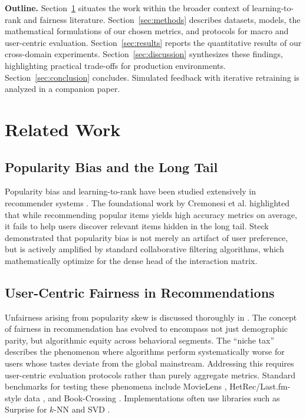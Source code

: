 \documentclass[conference]{IEEEtran}
\begin{document}
\textbf{Outline.} Section~\ref{sec:related} situates the work within the broader context of learning-to-rank and fairness literature. Section~\ref{sec:methods} describes datasets, models, the mathematical formulations of our chosen metrics, and protocols for macro and user-centric evaluation. Section~\ref{sec:results} reports the quantitative results of our cross-domain experiments. Section~\ref{sec:discussion} synthesizes these findings, highlighting practical trade-offs for production environments. Section~\ref{sec:conclusion} concludes. Simulated feedback with iterative retraining is analyzed in a companion paper.

\section{Related Work}
\label{sec:related}

\subsection{Popularity Bias and the Long Tail}
Popularity bias and learning-to-rank have been studied extensively in recommender systems \cite{abdollahpouri2017controlling}. The foundational work by Cremonesi et al. \cite{cremonesi2010performance} highlighted that while recommending popular items yields high accuracy metrics on average, it fails to help users discover relevant items hidden in the long tail. Steck \cite{steck2011item} demonstrated that popularity bias is not merely an artifact of user preference, but is actively amplified by standard collaborative filtering algorithms, which mathematically optimize for the dense head of the interaction matrix.

\subsection{User-Centric Fairness in Recommendations}
Unfairness arising from popularity skew is discussed thoroughly in \cite{abdollahpouri2019unfairness}. The concept of fairness in recommendation has evolved to encompass not just demographic parity, but algorithmic equity across behavioral segments. The ``niche tax'' describes the phenomenon where algorithms perform systematically worse for users whose tastes deviate from the global mainstream. Addressing this requires user-centric evaluation protocols rather than purely aggregate metrics. Standard benchmarks for testing these phenomena include MovieLens \cite{harper2015movielens}, HetRec/Last.fm-style data \cite{cantador2011second}, and Book-Crossing \cite{ziegler2005improving}. Implementations often use libraries such as Surprise for $k$-NN and SVD \cite{hug2020surprise}.
\end{document}
